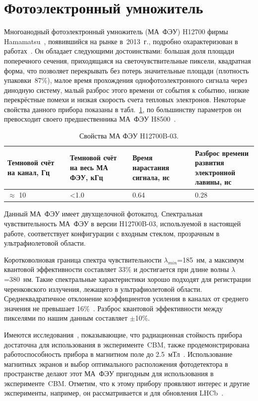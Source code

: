 \section{Фотоэлектронный умножитель}\label{section:secMapmt}

Многоанодный фотоэлектронный умножитель (МА~ФЭУ) H12700 фирмы Hamamatsu~\cite{H12700MANUAL}, появившийся на рынке в~2013~г., подробно охарактеризован в работах~\cite{CALVI, CALVI2}. Он обладает следующими достоинствами: большая доля площади поперечного сечения, приходящаяся на светочувствительные пиксели, квадратная форма, что позволяет перекрывать без потерь значительные площади (плотность упаковки~87\%), малое время прохождения однофотоэлектронного сигнала через динодную систему, малый разброс этого времени от события к событию, низкие перекрёстные помехи и низкая скорость счета тепловых электронов. Некоторые свойства данного прибора показаны в табл.~\ref{tabl:MAPMT}, по большинству параметров он превосходит своего предшественника МА~ФЭУ H8500~\cite{H8500MANUAL}.

\begin{table}[h]
\caption{Свойства МА ФЭУ H12700B-03.}
\label{tabl:MAPMT}
\begin{tabular}{ | p{0.25\linewidth} | p{0.25\linewidth} | p{0.25\linewidth} | p{0.25\linewidth} | }
	\hline
	Темновой счёт на канал, Гц & Темновой счёт на весь МА ФЭУ, кГц & Время нарастания сигнала, нс & Разброс времени развития электронной лавины, нс\\
	\hline
	$ \approx $ 10 & <1.0 & 0.64 & 0.28\\
	\hline
\end{tabular}
\end{table}

Данный МА~ФЭУ имеет двухщелочной фотокатод. Спектральная чувствительность МА~ФЭУ в версии H12700B-03, используемой в настоящей работе, соответствует конфигурации с входным стеклом, прозрачным в ультрафиолетовой области.

Коротковолновая граница спектра чувствительности $ \lambda_{min} $=185~нм, а максимум квантовой эффективности составляет 33\% и достигается при длине волны $ \lambda $=380~нм. Такие спектральные характеристики хорошо подходят для регистрации черенковского излучения, лежащего в ультрафиолетовой области. Среднеквадратичное отклонение коэффициентов усиления в каналах от среднего значения не превышает 16\%~\cite{H12700MANUAL}. Разброс квантовой эффективности между пикселями по нашим данным составляет $ \pm $10\%.

Имеются исследования~\cite{MAPMTRADHARD, THECBMRICHPROJ16, THECBMRICHDET16}, показывающие, что радиационная стойкость прибора достаточна для использования в эксперименте~CBM, также продемонстрирована работоспособность прибора в магнитном поле до 2.5~мТл~\cite{}. Использование магнитных экранов и выбор оптимального расположения фотодетектора в пространстве делают этот МА~ФЭУ пригодным для использования в эксперименте~CBM. Отметим, что к этому прибору проявляют интерес и другие эксперименты, например, он рассматривается и для обновления LHCb~\cite{CALVI}.


